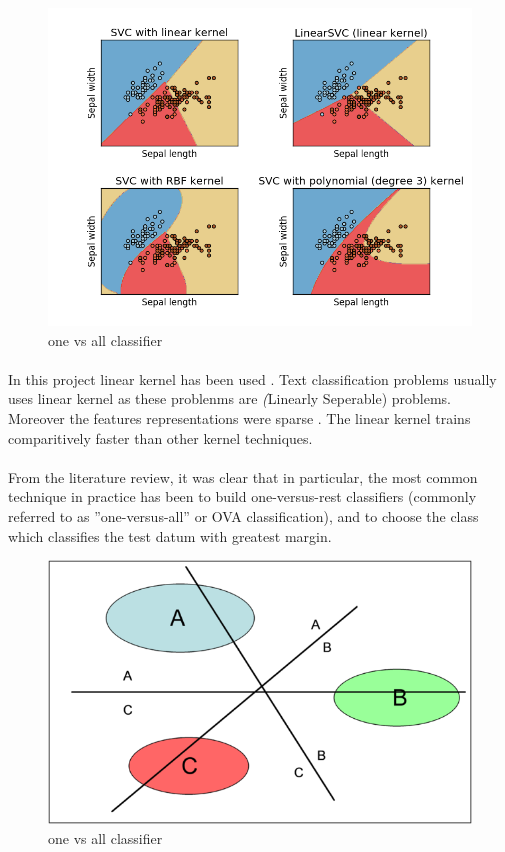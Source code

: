 \begin{figure}[!ht]
	\centering
	\includegraphics[width=0.9\linewidth]{svm_kernal.png}
	\caption{one vs all classifier}
	\label{fig:expression01}
\end{figure}

\paragraph{}
 In this project linear kernel has been used . Text classification problems usually uses linear kernel as these problenms are \textit(Linearly Seperable) problems. Moreover the features representations were sparse . The linear kernel trains comparitively faster than other kernel techniques.
 \paragraph{}
From the literature review, it was clear that in particular, the most  common technique in practice has been to build one-versus-rest classifiers  (commonly referred to as ”one-versus-all'' or OVA classification), and to choose  the class which classifies the test datum with greatest margin.
 \begin{figure}[!ht]
 	\centering
 	\includegraphics[width=0.9\linewidth]{svm_multi.png}
 	\caption{one vs all classifier}
 	\label{fig:expression01}
 \end{figure}
